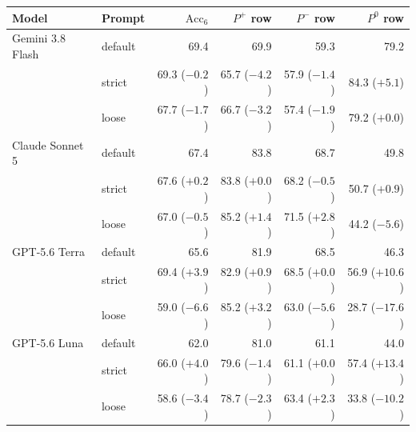 \begin{tabularx}{\linewidth}{@{}Xl rrrr@{}}
\toprule
Model & Prompt & $\mathrm{Acc}_6$ & $P^{+}$ row & $P^{-}$ row & $P^{0}$ row\\
\midrule
Gemini 3.8 Flash & default & 69.4 & 69.9 & 59.3 & 79.2\\
 & strict & 69.3 ($-0.2$) & 65.7 ($\mathbf{-4.2}$) & 57.9 ($-1.4$) & 84.3 ($\mathbf{+5.1}$)\\
 & loose & 67.7 ($-1.7$) & 66.7 ($\mathbf{-3.2}$) & 57.4 ($-1.9$) & 79.2 ($+0.0$)\\
\addlinespace[2pt]
Claude Sonnet 5 & default & 67.4 & 83.8 & 68.7 & 49.8\\
 & strict & 67.6 ($+0.2$) & 83.8 ($+0.0$) & 68.2 ($-0.5$) & 50.7 ($+0.9$)\\
 & loose & 67.0 ($-0.5$) & 85.2 ($+1.4$) & 71.5 ($+2.8$) & 44.2 ($\mathbf{-5.6}$)\\
\addlinespace[2pt]
GPT-5.6 Terra & default & 65.6 & 81.9 & 68.5 & 46.3\\
 & strict & 69.4 ($\mathbf{+3.9}$) & 82.9 ($+0.9$) & 68.5 ($+0.0$) & 56.9 ($\mathbf{+10.6}$)\\
 & loose & 59.0 ($\mathbf{-6.6}$) & 85.2 ($+3.2$) & 63.0 ($\mathbf{-5.6}$) & 28.7 ($\mathbf{-17.6}$)\\
\addlinespace[2pt]
GPT-5.6 Luna & default & 62.0 & 81.0 & 61.1 & 44.0\\
 & strict & 66.0 ($\mathbf{+4.0}$) & 79.6 ($-1.4$) & 61.1 ($+0.0$) & 57.4 ($\mathbf{+13.4}$)\\
 & loose & 58.6 ($\mathbf{-3.4}$) & 78.7 ($-2.3$) & 63.4 ($+2.3$) & 33.8 ($\mathbf{-10.2}$)\\
\bottomrule
\end{tabularx}
